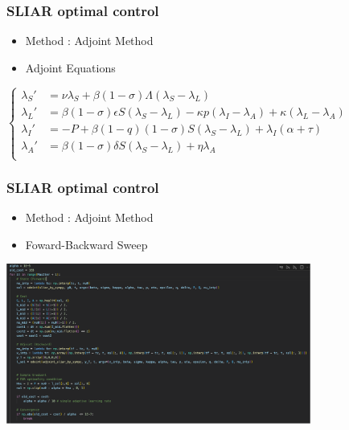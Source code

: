 \documentclass[usenames,dvipsnames, aspectratio=169, 9pt]{beamer}
\begin{document}
\begin{frame}\frametitle{SLIAR optimal control}
\begin{itemize}
    \item Method : Adjoint Method
    \item Adjoint Equations
\end{itemize}
    $\begin{cases}
        \lambda_S' &= \nu \lambda_S + \beta (1- \sigma)\Lambda(\lambda_S - \lambda_L) \\
        \lambda_L' &= \beta (1- \sigma) \epsilon S (\lambda_S - \lambda_L)- \kappa p (\lambda_I - \lambda_A) + \kappa (\lambda_L - \lambda_A)\\
        \lambda_I' &= - P + \beta (1 - q) (1 - \sigma) S (\lambda_S - \lambda_L) + \lambda_I (\alpha + \tau)\\
        \lambda_A' &= \beta (1- \sigma) \delta S (\lambda_S - \lambda_L) +  \eta \lambda_A\\
    \end{cases}$
\end{frame}

\begin{frame}\frametitle{SLIAR optimal control}
\begin{itemize}
    \item Method : Adjoint Method
    \item Foward-Backward Sweep
\end{itemize}
    \centering
    \includegraphics[width=10cm]{figure/code.png}
\end{frame}
\end{document}

